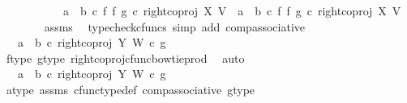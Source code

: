 \begin{isabellebody}
\ \ \isamarkupfalse%
\ {\isacharminus}{\kern0pt}\ \isanewline
\ \ \ \ \isamarkupfalse%
\ {\isachardoublequoteopen}{\isacharparenleft}{\kern0pt}a\ {\isasymamalg}\ b\ {\isasymcirc}\isactrlsub c\ f\ {\isasymbowtie}\isactrlsub f\ g{\isacharparenright}{\kern0pt}\ {\isasymcirc}\isactrlsub c\ right{\isacharunderscore}{\kern0pt}coproj\ X\ V\ {\isacharequal}{\kern0pt}\ {\isacharparenleft}{\kern0pt}a\ {\isasymamalg}\ b{\isacharparenright}{\kern0pt}\ {\isasymcirc}\isactrlsub c\ {\isacharparenleft}{\kern0pt}f\ {\isasymbowtie}\isactrlsub f\ g{\isacharparenright}{\kern0pt}\ {\isasymcirc}\isactrlsub c\ right{\isacharunderscore}{\kern0pt}coproj\ X\ V{\isachardoublequoteclose}\isanewline
\ \ \ \ \ \ \isamarkupfalse%
\ assms\ \isamarkupfalse%
\ {\isacharparenleft}{\kern0pt}typecheck{\isacharunderscore}{\kern0pt}cfuncs{\isacharcomma}{\kern0pt}\ simp\ add{\isacharcolon}{\kern0pt}\ comp{\isacharunderscore}{\kern0pt}associative{}{\isacharparenright}{\kern0pt}\isanewline
\ \ \ \ \isamarkupfalse%
\ \isamarkupfalse%
\ {\isachardoublequoteopen}{\isachardot}{\kern0pt}{\isachardot}{\kern0pt}{\isachardot}{\kern0pt}\ {\isacharequal}{\kern0pt}\ {\isacharparenleft}{\kern0pt}a\ {\isasymamalg}\ b{\isacharparenright}{\kern0pt}\ {\isasymcirc}\isactrlsub c\ right{\isacharunderscore}{\kern0pt}coproj\ Y\ W\ {\isasymcirc}\isactrlsub c\ g{\isachardoublequoteclose}\isanewline
\ \ \ \ \ \ \isamarkupfalse%
\ f{\isacharunderscore}{\kern0pt}type\ g{\isacharunderscore}{\kern0pt}type\ right{\isacharunderscore}{\kern0pt}coproj{\isacharunderscore}{\kern0pt}cfunc{\isacharunderscore}{\kern0pt}bowtie{\isacharunderscore}{\kern0pt}prod\ \isamarkupfalse%
\ auto\isanewline
\ \ \ \ \isamarkupfalse%
\ \isamarkupfalse%
\ {\isachardoublequoteopen}{\isachardot}{\kern0pt}{\isachardot}{\kern0pt}{\isachardot}{\kern0pt}\ {\isacharequal}{\kern0pt}\ {\isacharparenleft}{\kern0pt}{\isacharparenleft}{\kern0pt}a\ {\isasymamalg}\ b{\isacharparenright}{\kern0pt}\ {\isasymcirc}\isactrlsub c\ right{\isacharunderscore}{\kern0pt}coproj\ Y\ W{\isacharparenright}{\kern0pt}\ {\isasymcirc}\isactrlsub c\ g{\isachardoublequoteclose}\isanewline
\ \ \ \ \ \ \isamarkupfalse%
\ a{\isacharunderscore}{\kern0pt}type\ assms{\isacharparenleft}{\kern0pt}{}{\isacharparenright}{\kern0pt}\ cfunc{\isacharunderscore}{\kern0pt}type{\isacharunderscore}{\kern0pt}def\ comp{\isacharunderscore}{\kern0pt}associative\ g{\isacharunderscore}{\kern0pt}type\ \isamarkupfalse%

\end{isabellebody}
